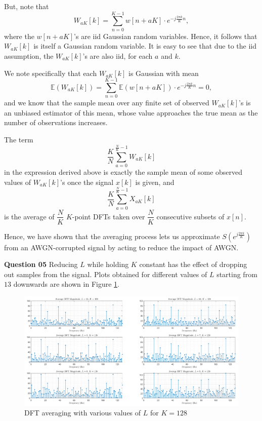 \documentclass{article}[a4paper]
\begin{document}
	But, note that \[
		W_{aK}[k] = \sum_{n=0}^{K-1} w[n + aK] \cdot e^{-j\frac{2\pi k}{K} n},
	\] where the $w[n + aK]$'s are iid Gaussian random variables. Hence, it follows that $W_{aK}[k]$ is itself a Gaussian random variable. It is easy to see that due to the iid assumption, the $W_{aK}[k]$'s are also iid, for each $a$ and $k$.
	
	We note specifically that each $W_{aK}[k]$ is Gaussian with mean \[
		\mathbb{E}\left(W_{aK}[k]\right)
		=
		\sum_{n=0}^{K-1} \mathbb{E}\left(w[n + aK]\right) \cdot e^{-j\frac{2\pi k}{K} n}
		= 0,
	\] and we know that the sample mean over any finite set of observed $W_{aK}[k]$'s is an unbiased estimator of this mean, whose value approaches the true mean as the number of observations increases.
	
	The term \[
		\dfrac{K}{N} \sum_{a=0}^{\frac{N}{K}-1} W_{aK} [k]
	\] in the expression derived above is exactly the sample mean of some observed values of $W_{aK}[k]$'s once the signal $x[k]$ is given, and \[
		\dfrac{K}{N} \sum_{a=0}^{\frac{N}{K}-1} X_{aK} [k]
	\] is the average of $\dfrac{N}{K}$ $K$-point DFTs taken over $\dfrac{N}{K}$ consecutive subsets of $x[n]$.
	
	Hence, we have shown that the averaging process lets us approximate $S\left(e^{j\frac{2\pi k}{K}}\right)$ from an AWGN-corrupted signal by acting to reduce the impact of AWGN.
	\medskip
	
	\textbf{Question 05} Reducing $L$ while holding $K$ constant has the effect of dropping out samples from the signal. Plots obtained for different values of $L$ starting from $13$ downwards are shown in Figure \ref{smallestl}.
	
	\begin{figure}[H]
		\centering
		\includegraphics[width=\linewidth]{images/smallest_l.png}
		\caption{DFT averaging with various values of $L$ for $K=128$}
		\label{smallestl}
	\end{figure}
	
\end{document}

